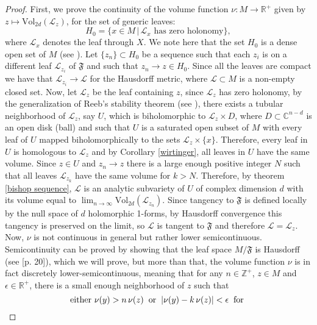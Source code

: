 \documentclass[12pt,twoside,a4paper]{report}
\newcommand{\zah}{\ensuremath{ \mathbb Z }}
\newcommand{\re}{\ensuremath{\mathbb R }}
\newcommand{\co}{\ensuremath{\mathbb C }}
\begin{document}
\begin{proof}
First, we prove the continuity of the volume function $\nu:M\rightarrow\re^{+}$ given by
$z\mapsto \textrm{Vol}_{2d}(\mathcal{L}_z)$, for the set of generic leaves:
$$
H_0=\lbrace x\in M\,\vert\,\mathcal{L}_x\text{ has zero holonomy}\rbrace,
$$
where $\mathcal{L}_x$ denotes the leaf through $X$. We note here that the set $H_0$ is a dense
open set of $M$ (see \cite{EMT}). Let $\lbrace z_n\rbrace\subset H_0$ be a
sequence such that each $z_i$ is on a different leaf $\mathcal{L}_{z_i}$ of
$\mathfrak{F}$ and such that $z_n\rightarrow z\in H_0$. Since all the leaves
are compact we have that $\mathcal{L}_{z_i}\rightarrow\mathcal{L}$ for the
Hausdorff metric, where $\mathcal{L}\subset M$ is a non-empty closed set.
Now, let $\mathcal{L}_z$ be the leaf containing $z$, since $\mathcal{L}_z$ has zero
holonomy, by the generalization of Reeb's stability theorem (see \cite{Thurston}), there exists a tubular neighborhood of
$\mathcal{L}_z$, say $U$, which is biholomorphic to $\mathcal{L}_z\times D$,
where $D\subset\co^{n-d}$ is an open disk (ball) and such that $U$ is a
saturated open subset of $M$ with every leaf of $U$ mapped biholomorphically to
the sets $\mathcal{L}_z\times\lbrace x \rbrace$. Therefore, every leaf in $U$ is
homologous to $\mathcal{L}_z$ and by Corollary \ref{wirtinger}, all leaves in
$U$ have the same volume. Since $z\in U$ and $z_n\rightarrow z$ there is a
large enough positive integer $N$ such that all leaves $\mathcal{L}_{z_k}$ have
the same volume for $k>N$. Therefore, by theorem \ref{bishop sequence},
$\mathcal{L}$ is an analytic subvariety of $U$ of complex dimension $d$ with
its volume equal to $\lim_{n\rightarrow\infty} \textrm{Vol}_{2d}(\mathcal{L}_{z_n})$. Since
tangency to $\mathfrak{F}$ is defined locally by the null space of $d$ holomorphic
1-forms, by Hausdorff convergence this tangency
is preserved on the limit, so $\mathcal{L}$ is tangent to $\mathfrak{F}$ and therefore $\mathcal{L}=\mathcal{L}_z$. Now, $\nu$
is not continuous in general but rather lower semicontinuous. Semicontinuity can
be proved by showing that the leaf space $M/\mathfrak{F}$ is Hausdorff (see \cite{EMS}[p. 20]),
which we will prove, but more than that, the volume
function $\nu$ is in fact discretely lower-semicontinuous, meaning that for any
$n\in\zah^+$, $z\in M$ and $\epsilon\in\re^+$, there is a small enough
neighborhood of $z$ such that
$$
\text{either }\nu(y)>n\,\nu(z)\hspace{0.2cm}\text{or}\hspace{0.2cm}\vert\nu(y)-k\,\nu(z)\vert<\epsilon\hspace{0.2cm}\text{for
}$$
\end{proof}
\end{document}
